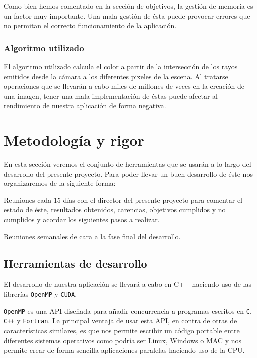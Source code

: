 \documentclass[titlepage,12pt]{report}
\begin{document}
Como bien hemos comentado en la sección de objetivos, la gestión de memoria es un factor muy importante. Una mala gestión de ésta puede provocar errores que no permitan el correcto funcionamiento de la aplicación.

\subsubsection{Algoritmo utilizado}

El algoritmo utilizado calcula el color a partir de la intersección de los rayos emitidos desde la cámara a los diferentes pixeles de la escena. Al tratarse operaciones que se llevarán a cabo miles de millones de veces en la creación de una imagen, tener una mala implementación de éstas puede afectar al rendimiento de nuestra aplicación de forma negativa.

\section{Metodología y rigor}

En esta sección veremos el conjunto de herramientas que se usarán a lo largo del desarrollo del presente proyecto. Para poder llevar un buen desarrollo de éste nos organizaremos de la siguiente forma: \begin{enumerate*}[label=\roman*)] \item Reuniones cada 15 días con el director del presente proyecto para comentar el estado de éste, resultados obtenidos, carencias, objetivos cumplidos y no cumplidos y acordar los siguientes pasos a realizar. \item Reuniones semanales de cara a la fase final del desarrollo. \end{enumerate*}

\subsection{Herramientas de desarrollo}

El desarrollo de nuestra aplicación se llevará a cabo en C++ haciendo uso de las librerías \texttt{OpenMP} y \texttt{CUDA}. 

\texttt{OpenMP} es una API diseñada para añadir concurrencia a programas escritos en \texttt{C}, \texttt{C++} y \texttt{Fortran}. La principal ventaja de usar esta API, en contra de otras de características similares, es que nos permite escribir un código portable entre diferentes sistemas operativos como podría ser Linux, Windows o MAC y nos permite crear de forma sencilla aplicaciones paralelas haciendo uso de la CPU.
\end{document}

